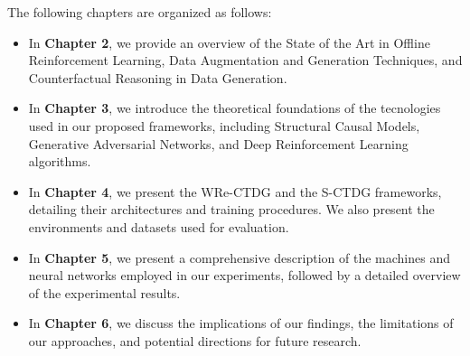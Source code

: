 The following chapters are organized as follows:
\begin{itemize}
    \item In \textbf{Chapter 2}, we provide an overview of the State of the Art
    in Offline Reinforcement Learning, Data Augmentation and Generation Techniques,
    and Counterfactual Reasoning in Data Generation.
    \item In \textbf{Chapter 3}, we introduce the theoretical foundations
    of the tecnologies used in our proposed frameworks,
    including Structural Causal Models,
    Generative Adversarial Networks,
    and Deep Reinforcement Learning algorithms.
    \item In \textbf{Chapter 4}, we present the WRe-CTDG
    and the S-CTDG frameworks,
    detailing their architectures and training procedures.
    We also present the environments and datasets used for evaluation.
    \item In \textbf{Chapter 5}, we present a comprehensive description
    of the machines and neural networks employed in our experiments,
    followed by a detailed overview of the experimental results.
    \item In \textbf{Chapter 6}, we discuss the implications of our findings,
    the limitations of our approaches,
    and potential directions for future research.
\end{itemize}